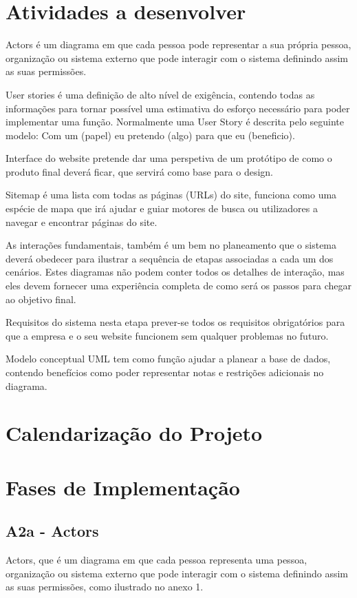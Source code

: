 \documentclass[11pt]{report}
\begin{document}
\linebreak
\newpage
\section{Atividades a desenvolver}
Actors é um diagrama em que cada pessoa pode representar a sua própria pessoa, organização ou sistema externo que pode interagir com o sistema definindo assim as suas permissões.

User stories é uma definição de alto nível de exigência, contendo todas as informações para tornar possível uma estimativa do esforço necessário para poder implementar uma função. Normalmente uma User Story é descrita pelo seguinte modelo: 
Com um (papel) eu pretendo (algo) para que eu (beneficio).

Interface do website pretende dar uma perspetiva de um protótipo de como o produto final deverá ficar, que servirá como base para o design.

Sitemap é uma lista com todas as páginas (URLs) do site, funciona como uma espécie de mapa que irá ajudar e guiar motores de busca ou utilizadores a navegar e encontrar páginas do site.

As interações fundamentais, também é um bem  no planeamento que o sistema deverá obedecer para ilustrar a sequência de etapas associadas a cada um dos cenários.
Estes diagramas não podem conter todos os detalhes de interação, mas eles devem fornecer uma experiência completa de como será os passos para chegar ao objetivo final.


Requisitos do sistema nesta etapa prever-se todos os requisitos obrigatórios para que a empresa e o seu website funcionem sem qualquer problemas no futuro.

Modelo conceptual UML tem como função ajudar a planear a base de dados, contendo benefícios como poder representar notas e restrições adicionais no diagrama.

\section{Calendarização do Projeto}

\section{Fases de Implementação}

\subsection{A2a - Actors}
	Actors, que é um diagrama em que cada pessoa representa uma pessoa, organização ou sistema externo que pode interagir com o sistema definindo assim as suas permissões, como ilustrado no anexo 1.
\end{document}
